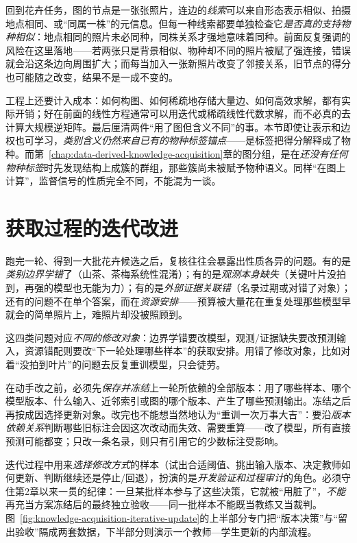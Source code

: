 回到花卉任务，图的节点是一张张照片，连边的\emph{线索}可以来自形态表示相似、拍摄地点相同、或“同属一株”的元信息。但每一种线索都要单独检查它\emph{是否真的支持物种相似}：地点相同的照片未必同种，同株关系才强地意味着同种。前面反复强调的风险在这里落地——若两张只是背景相似、物种却不同的照片被赋了强连接，错误就会沿这条边向周围扩大；而每当加入一张新照片改变了邻接关系，旧节点的得分也可能随之改变，结果不是一成不变的。

工程上还要计入成本：如何构图、如何稀疏地存储大量边、如何高效求解，都有实际开销；好在前面的线性方程通常可以用迭代或稀疏线性代数求解，而不必真的去计算大规模逆矩阵。最后厘清两件“用了图但含义不同”的事。本节即使让表示和边权也可学习，\emph{类别含义仍然来自已有的物种标签锚点}——是标签把得分解释成了物种。而第~\ref{chap:data-derived-knowledge-acquisition}章的图分组，是在\emph{还没有任何物种标签}时先发现结构上成簇的群组，那些簇尚未被赋予物种语义。同样“在图上计算”，监督信号的性质完全不同，不能混为一谈。

\section{获取过程的迭代改进}
\label{sec:knowledge-acquisition-iterative-improvement}

跑完一轮、得到一大批花卉候选之后，复核往往会暴露出性质各异的问题。有的是\emph{类别边界学错}了（山茶、茶梅系统性混淆）；有的是\emph{观测本身缺失}（关键叶片没拍到，再强的模型也无能为力）；有的是\emph{外部证据关联错}（名录过期或对错了对象）；还有的问题不在单个答案，而在\emph{资源安排}——预算被大量花在重复处理那些模型早就会的简单照片上，难照片却没被照顾到。

这四类问题对应\emph{不同的修改对象}：边界学错要改模型，观测/证据缺失要改预测输入，资源错配则要改“下一轮处理哪些样本”的获取安排。用错了修改对象，比如对着“没拍到叶片”的问题去反复重训模型，只会徒劳。

在动手改之前，必须先\emph{保存并冻结}上一轮所依赖的全部版本：用了哪些样本、哪个模型版本、什么输入、近邻索引或图的哪个版本、产生了哪些预测输出。冻结之后再按成因选择更新对象。改完也不能想当然地认为“重训一次万事大吉”：要沿\emph{版本依赖关系}判断哪些旧标注会因这次改动而失效、需要重算——改了模型，所有直接预测可能都变；只改一条名录，则只有引用它的少数标注受影响。

迭代过程中用来\emph{选择修改方式}的样本（试出合适阈值、挑出输入版本、决定教师如何更新、判断继续还是停止/回退），扮演的是\emph{开发验证和过程审计}的角色。必须守住第2章以来一贯的纪律：一旦某批样本参与了这些决策，它就被“用脏了”，\emph{不能}再充当方案冻结后的最终独立验收——同一批样本不能既当教练又当裁判。图~\ref{fig:knowledge-acquisition-iterative-update}的上半部分专门把“版本决策”与“留出验收”隔成两套数据，下半部分则演示一个教师—学生更新的内部流程。

